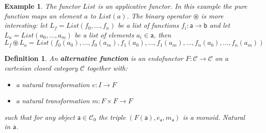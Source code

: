 \documentclass{article}
\newcommand{\cat}[1]{\mathcal{#1}} %
\newcommand{\cato}[1]{\cat{#1}_0} %
\newcommand{\ob}[1]{\mathsf{#1}} %
\newtheorem{definition}[theorem]{Definition}
\newtheorem{example}[theorem]{Example}
\begin{document}
\begin{example}
	The functor $List$ is an applicative functor.
	In this example the pure function maps an element $a$ to $List(a)$. The binary operator $\circledast$ is more interesting:
	let $L_f = List(f_0, \dots, f_n)$ be a list of functions $f_i: \ob{a} \rightarrow \ob{b}$ and let $L_a = List(a_0, \dots, a_m)$ be a list of elements $a_i \in \ob{a}$, then
	$$L_f \circledast L_a = List(f_0(a_0), \dots, f_0(a_m), f_1(a_0), \dots, f_1(a_m), \dots, f_n(a_0), \dots, f_n(a_m))$$
\end{example}

\begin{definition}
    An \textbf{alternative function} is an endofunctor $F: \cat{C} \rightarrow \cat{C}$ on a cartesian closed category $\cat{C}$ together with:
    \begin{itemize}
        \item a natural transformation $e: I \rightarrow F$
        \item a natural transformation $m: F \times F \rightarrow F$
    \end{itemize}
    such that for any object $\ob{a} \in \cato{C}$ the triple $(F(\ob{a}), e_{\ob{a}}, m_{\ob{a}})$ is a monoid. Natural in $\ob{a}$.
\end{definition}
\end{document}
